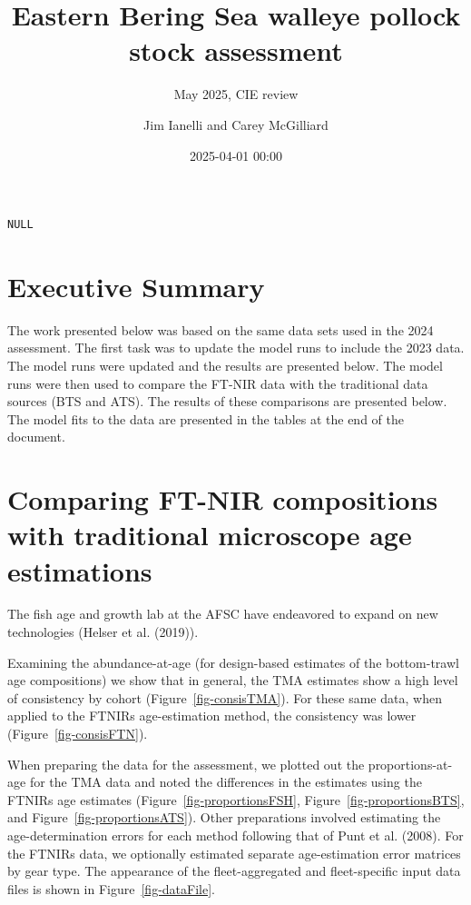\documentclass[
  letterpaper,
  DIV=11,
  numbers=noendperiod]{scrreprt}
\title{Eastern Bering Sea walleye pollock stock assessment}
\subtitle{May 2025, CIE review}
\author{Jim Ianelli and Carey McGilliard}
\date{2025-04-01 00:00}
\begin{document}
\maketitle


\begin{verbatim}
NULL
\end{verbatim}

\chapter{Executive Summary}\label{executive-summary}

The work presented below was based on the same data sets used in the
2024 assessment. The first task was to update the model runs to include
the 2023 data. The model runs were updated and the results are presented
below. The model runs were then used to compare the FT-NIR data with the
traditional data sources (BTS and ATS). The results of these comparisons
are presented below. The model fits to the data are presented in the
tables at the end of the document.

\chapter{Comparing FT-NIR compositions with traditional microscope age
estimations}\label{comparing-ft-nir-compositions-with-traditional-microscope-age-estimations}

The fish age and growth lab at the AFSC have endeavored to expand on new
technologies (Helser et al. (2019)).

Examining the abundance-at-age (for design-based estimates of the
bottom-trawl age compositions) we show that in general, the TMA
estimates show a high level of consistency by cohort
(Figure~\ref{fig-consisTMA}). For these same data, when applied to the
FTNIRs age-estimation method, the consistency was lower
(Figure~\ref{fig-consisFTN}).

When preparing the data for the assessment, we plotted out the
proportions-at-age for the TMA data and noted the differences in the
estimates using the FTNIRs age estimates
(Figure~\ref{fig-proportionsFSH}, Figure~\ref{fig-proportionsBTS}, and
Figure~\ref{fig-proportionsATS}). Other preparations involved estimating
the age-determination errors for each method following that of Punt et
al. (2008). For the FTNIRs data, we optionally estimated separate
age-estimation error matrices by gear type. The appearance of the
fleet-aggregated and fleet-specific input data files is shown in
Figure~\ref{fig-dataFile}.
\end{document}
